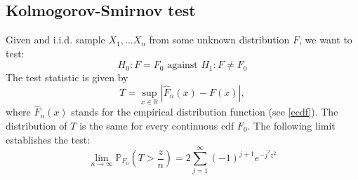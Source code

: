 \documentclass[12pt]{article}
\theoremstyle{definition}
\theoremstyle{remark}
\numberwithin{equation}{section}
\newcommand{\RR}{\mathbb{R}}
\newcommand{\PP}{\mathbb{P}}
\begin{document}
\subsection{Kolmogorov-Smirnov test}
Given and i.i.d. sample $X_1, \ldots X_n$ from some unknown distribution $F$, we want to test:
\begin{equation}\label{kstest}
H_0: F = F_0 \text{ against } H_1: F\neq F_0
\end{equation}
The test statistic is given by
\begin{equation}\label{ksstatistic}
	T = \sup_{x\in\RR} |\hat F_n(x) - F(x)|,
\end{equation}
where $\hat F_n(x)$ stands for the empirical distribution function (see \ref{ecdf}). The distribution of $T$ is the same for every continuous cdf $F_0$. The following limit establishes the test:
\begin{equation}
\lim_{n\rightarrow \infty}\PP_{F_0}\left(T > \frac zn\right) = 2\sum_{j = 1}^\infty(-1)^{j+1}e^{-j^2z^2}
\end{equation}
\end{document}
